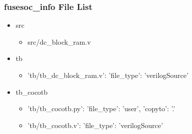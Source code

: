 \subsubsection{fusesoc\_info File List}
\begin{itemize}
\item src
	\begin{itemize}
	\item src/dc\_block\_ram.v
	\end{itemize}
\item tb
	\begin{itemize}
	\item {'tb/tb\_dc\_block\_ram.v': {'file\_type': 'verilogSource'}}
	\end{itemize}
\item tb\_cocotb
	\begin{itemize}
	\item {'tb/tb\_cocotb.py': {'file\_type': 'user', 'copyto': '.'}}
	\item {'tb/tb\_cocotb.v': {'file\_type': 'verilogSource'}}
	\end{itemize}
\end{itemize}
